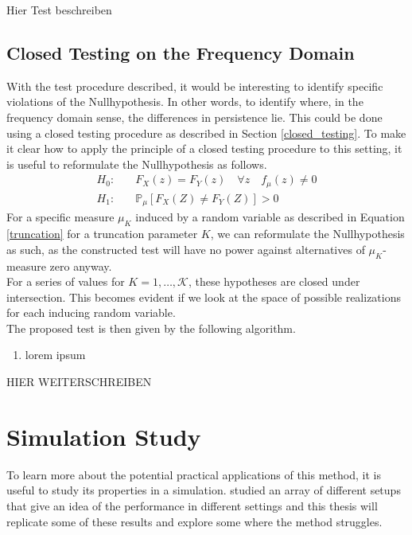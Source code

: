 \documentclass[12pt, a4paper]{article}
\theoremstyle{MAstyle} \newtheorem{assumption}{Assumption}[section]
\theoremstyle{MAstyle} \newtheorem{definition}{Definition}[section]
\theoremstyle{MAstyle} \newtheorem{theorem}{Theorem}[section]
\begin{document}
		{\color{red} Hier Test beschreiben}
		
		\subsection{Closed Testing on the Frequency Domain}
		With the test procedure described, it would be interesting to identify specific violations of the Nullhypothesis. In other words, to identify where, in the frequency domain sense, the differences in persistence lie. This could be done using a closed testing procedure as described in Section \ref{closed_testing}. To make it clear how to apply the principle of a closed testing procedure to this setting, it is useful to reformulate the Nullhypothesis as follows.		
		\begin{equation}
			\begin{split}
				H_0: \quad &F_X(z) = F_Y(z) \quad \forall z \quad  f_{\mu}(z) \neq 0\\
				H_1: \quad &\mathbb{P}_{\mu}\left[F_X(Z) \neq F_Y(Z)\right] > 0
			\end{split}
		\end{equation}
		 For a specific measure $\mu_K$ induced by a random variable as described in Equation \ref{truncation} for a truncation parameter $K$, we can reformulate the Nullhypothesis as such, as the constructed test will have no power against alternatives of $\mu_K$-measure zero anyway.\\
		 For a series of values for $K = 1, \dots, \mathcal{K}$, these hypotheses are closed under intersection. This becomes evident if we look at the space of possible realizations for each inducing random variable.\\
		 
		 The proposed test is then given by the following algorithm.
		 \begin{enumerate}
		 	\item lorem ipsum
		 \end{enumerate}
		 {\color{red} HIER WEITERSCHREIBEN}

		
	\section{Simulation Study}\label{Simulation_Study}
		To learn more about the potential practical applications of this method, it is useful to study its properties in a simulation. \cite{bugni_permutation_2021} studied an array of different setups that give an idea of the performance in different settings and this thesis will replicate some of these results and explore some where the method struggles.
	
\end{document}
